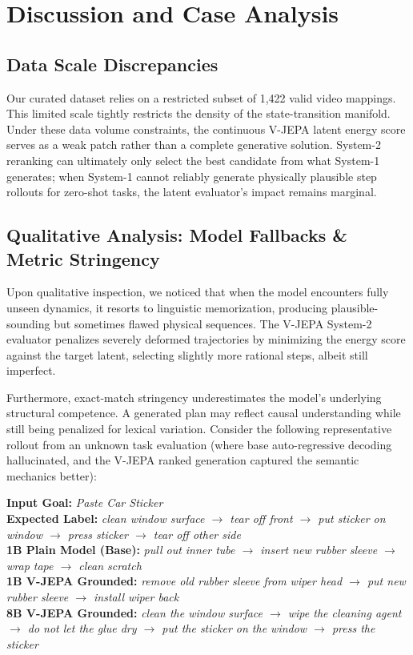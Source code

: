 \documentclass{article}
\begin{document}
\section{Discussion and Case Analysis}

\subsection{Data Scale Discrepancies}
Our curated dataset relies on a restricted subset of 1,422 valid video mappings. This limited scale tightly restricts the density of the state-transition manifold. Under these data volume constraints, the continuous V-JEPA latent energy score serves as a weak patch rather than a complete generative solution. System-2 reranking can ultimately only select the best candidate from what System-1 generates; when System-1 cannot reliably generate physically plausible step rollouts for zero-shot tasks, the latent evaluator's impact remains marginal.

\subsection{Qualitative Analysis: Model Fallbacks \& Metric Stringency}
Upon qualitative inspection, we noticed that when the model encounters fully unseen dynamics, it resorts to linguistic memorization, producing plausible-sounding but sometimes flawed physical sequences. The V-JEPA System-2 evaluator penalizes severely deformed trajectories by minimizing the energy score against the target latent, selecting slightly more rational steps, albeit still imperfect.

Furthermore, exact-match stringency underestimates the model's underlying structural competence. A generated plan may reflect causal understanding while still being penalized for lexical variation. Consider the following representative rollout from an unknown task evaluation (where base auto-regressive decoding hallucinated, and the V-JEPA ranked generation captured the semantic mechanics better):

\vspace{0.5em}
\noindent
\textbf{Input Goal:} \textit{Paste Car Sticker} \\
\textbf{Expected Label:} \textit{clean window surface $\rightarrow$ tear off front $\rightarrow$ put sticker on window $\rightarrow$ press sticker $\rightarrow$ tear off other side} \\
\textbf{1B Plain Model (Base):} \textit{pull out inner tube $\rightarrow$ insert new rubber sleeve $\rightarrow$ wrap tape $\rightarrow$ clean scratch} \\
\textbf{1B V-JEPA Grounded:} \textit{remove old rubber sleeve from wiper head $\rightarrow$ put new rubber sleeve $\rightarrow$ install wiper back} \\
\textbf{8B V-JEPA Grounded:} \textit{clean the window surface $\rightarrow$ wipe the cleaning agent $\rightarrow$ do not let the glue dry $\rightarrow$ put the sticker on the window $\rightarrow$ press the sticker}
\vspace{0.5em}
\end{document}
